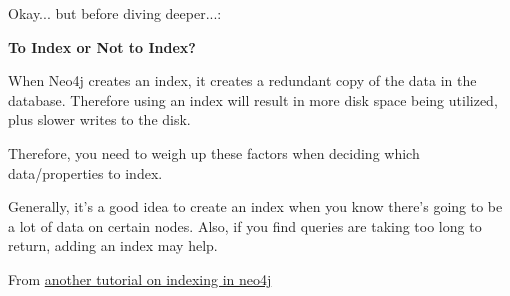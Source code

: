 \documentclass{article}
\begin{document}
Okay... but before diving deeper...:

\textbf{To Index or Not to Index?}
\begin{tcolorbox}
When Neo4j creates an index, it creates a redundant copy of the data in the database. Therefore using an index will result in more disk space being utilized, plus slower writes to the disk.

Therefore, you need to weigh up these factors when deciding which data/properties to index.

Generally, it's a good idea to create an index when you know there's going to be a lot of data on certain nodes. Also, if you find queries are taking too long to return, adding an index may help.
\end{tcolorbox}

From \href{https://www.quackit.com/neo4j/tutorial/neo4j_create_an_index_using_cypher.cfm#google_vignette}{another tutorial on indexing in neo4j}
\end{document}

